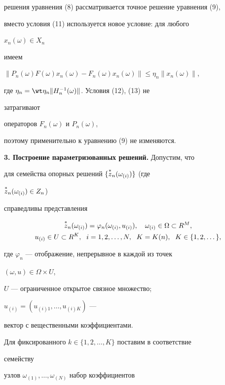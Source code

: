 решения уравнения (8) рассматривается точное решение уравнения (9),


вместо условия (11) используется новое условие: для любого


$x_n(\omega)\in X_n$


имеем


$\|P_n(\omega)F(\omega)x_n(\omega)-F_n(\omega)x_n(\omega)\|\le


\eta_n\|x_n(\omega)\|$,


где $\eta_n=\wt\eta_n\|H^{-1}_n(\omega)\|$. Условия (12), (13) не


затрагивают


операторов $F_n(\omega)$ и $P_n(\omega)$,


поэтому применительно к уравнению (9) не изменяются.


\medskip





{\bf 3. Построение параметризованных решений.} Допустим, что


для семейства опорных решений $\{\overset{*}{z}{}_n(\omega_{(i)})\}$ (где


$\overset{*}{z}{}_n(\omega_{(i)})\in Z_n$)


справедливы представления


\begin{gather}


\up{*}{z}_n(\omega_{(i)})=\varphi_n(\omega_{(i)},u_{(i)}),\quad


\omega_{(i)}\in\Omega\subset R^M, \notag \\


u_{(i)}\in U\subset R^K, \ \;i=1,2,\dotsc,N,\ \;


K=K(n),\ \;K\in\{1,2,\dotsc\},


\end{gather}


где $\varphi_n$ --- отображение, непрерывное в каждой из точек


$(\omega,u)\in\Omega\times U$,


$U$ --- ограниченное открытое связное множество;


$u_{(i)}=(u_{(i)1},\dotsc,u_{(i)K})$ ---


вектор с вещественными коэффициентами.





Для фиксированного $k\in\{1,2,\dotsc,K\}$ поставим в соответствие


семейству


узлов $\omega_{(1)},\dotsc,\omega_{(N)}$ набор коэффициентов


